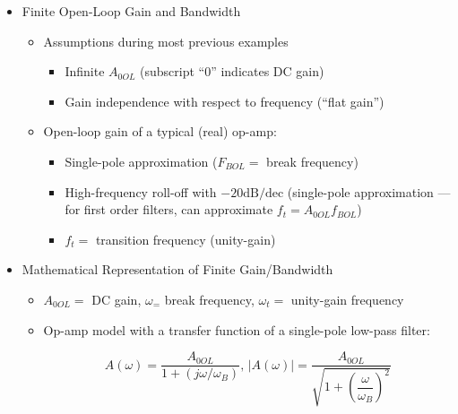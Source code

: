 \begin{itemize}

  \item Finite Open-Loop Gain and Bandwidth

    \begin{itemize}

      \item Assumptions during most previous examples

        \begin{itemize}

          \item Infinite $A_{0OL}$ (subscript ``0'' indicates DC gain)

          \item Gain independence with respect to frequency (``flat gain'')

        \end{itemize}

      \item Open-loop gain of a typical (real) op-amp:

        \begin{itemize}

          \item Single-pole approximation ($F_{BOL}=$ break frequency)

          \item High-frequency roll-off with $-20\text{dB/dec}$ (single-pole approximation — for first order filters, can approximate $f_{t}=A_{0OL}f_{BOL}$)

          \item $f_t=$ transition frequency (unity-gain)

        \end{itemize}

    \end{itemize}

  \item Mathematical Representation of Finite Gain/Bandwidth

    \begin{itemize}

      \item $A_{0OL}=$ DC gain, $\omega_=$ break frequency, $\omega_t=$ unity-gain frequency

      \item Op-amp model with a transfer function of a single-pole low-pass filter:

        $$A(\omega)=\frac{A_{0OL}}{1+(j\omega/\omega_B)},\,|A(\omega)|=\frac{A_{0OL}}{\sqrt{1+\left( \dfrac{\omega}{\omega_B} \right)^2}}$$


\end{itemize}
\end{itemize}
